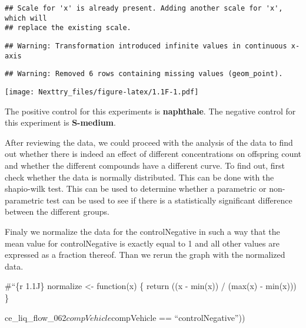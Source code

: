 \documentclass[
]{book}
\begin{document}
\begin{verbatim}
## Scale for 'x' is already present. Adding another scale for 'x', which will
## replace the existing scale.
\end{verbatim}

\begin{verbatim}
## Warning: Transformation introduced infinite values in continuous x-axis
\end{verbatim}

\begin{verbatim}
## Warning: Removed 6 rows containing missing values (geom_point).
\end{verbatim}

\texttt{[image: Nexttry\_files/figure-latex/1.1F-1.pdf]}

The positive control for this experiments is \textbf{naphthale}. The negative control for this experiment is \textbf{S-medium}.

After reviewing the data, we could proceed with the analysis of the data to find out whether there is indeed an effect of different concentrations on offspring count and whether the different compounds have a different curve. To find out, first check whether the data is normally distributed. This can be done with the shapio-wilk test. This can be used to determine whether a parametric or non-parametric test can be used to see if there is a statistically significant difference between the different groups.

Finaly we normalize the data for the controlNegative in such a way that the mean value for controlNegative is exactly equal to 1 and all other values are expressed as a fraction thereof. Than we rerun the graph with the normalized data.

\#``\{r 1.1J\}
normalize \textless- function(x) \{
return ((x - min(x)) / (max(x) - min(x)))
\}

ce\_liq\_flow\_062\(compVehicle %
\)compVehicle == ``controlNegative''))
\end{document}
